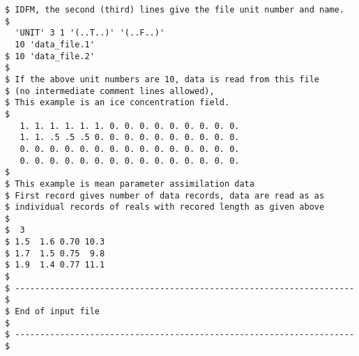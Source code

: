 \begin{verbatim}
$ IDFM, the second (third) lines give the file unit number and name.
$
  'UNIT' 3 1 '(..T..)' '(..F..)' 
  10 'data_file.1'
$ 10 'data_file.2'
$
$ If the above unit numbers are 10, data is read from this file
$ (no intermediate comment lines allowed),
$ This example is an ice concentration field.
$
   1. 1. 1. 1. 1. 1. 0. 0. 0. 0. 0. 0. 0. 0. 0.
   1. 1. .5 .5 .5 0. 0. 0. 0. 0. 0. 0. 0. 0. 0.
   0. 0. 0. 0. 0. 0. 0. 0. 0. 0. 0. 0. 0. 0. 0.
   0. 0. 0. 0. 0. 0. 0. 0. 0. 0. 0. 0. 0. 0. 0.
$
$ This example is mean parameter assimilation data
$ First record gives number of data records, data are read as as
$ individual records of reals with recored length as given above
$
$  3
$ 1.5  1.6 0.70 10.3
$ 1.7  1.5 0.75  9.8
$ 1.9  1.4 0.77 11.1
$
$ -------------------------------------------------------------------- $
$ End of input file                                                    $
$ -------------------------------------------------------------------- $
\end{verbatim}
